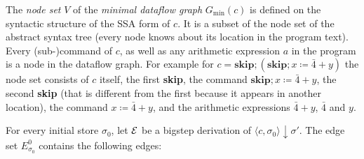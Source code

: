 The \emph{node set} $V$ of the \emph{minimal dataflow graph} $G_\text{min}(c)$
is defined on the syntactic structure
of the SSA form of $c$. It is a subset of the node set of the abstract syntax tree
(every node knows about its location in the program text).
Every (sub-)command of $c$, as well as any arithmetic expression $a$ in the 
program is a node in the dataflow graph.
For example for
$c = \textbf{skip}; (\textbf{skip}; x \coloneqq \bar{4} + y)$
the node set consists of $c$ itself, the first \textbf{skip}, the command 
$\textbf{skip}; x \coloneqq \bar{4} + y$, the second \textbf{skip} (that is different 
from the first because it appears in another location), the command
$x \coloneqq \bar{4} + y$, and the arithmetic expressions $\bar{4}+y$,
$\bar{4}$ and $y$.


For every initial store $\sigma_0$, 
let $\operatorname{\mathcal{E}}$ be a bigstep derivation of $\langle c, \sigma_0 \rangle \downarrow \sigma'$.
The edge set $E^0_{\sigma_0}$ contains the following edges:
